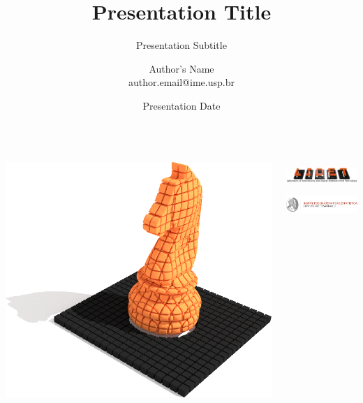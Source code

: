 \expandafter\documentclass\expandafter[table, usenames, svgnames, dvipsnames, \classopts]{beamer}
\title{\textbf{Presentation Title}}
\subtitle{{\small Presentation Subtitle}}
\author[Author's Name]{\scriptsize
    Author's Name\\
    author.email@ime.usp.br
}
\institute[LIDET (IME - USP)]{\\[1.0mm] 
MSc/PhD Student\\
Department of Computer Science}
\date{{\tiny Presentation Date}}
\begin{document}


{%
\begin{frame}

	\begin{columns}[c]
			\hspace*{-1.5em}
			\includegraphics[width=0.35\paperwidth]{side_bar}\\
			\titlepage
			\hspace*{+0.5em}
			\begin{center}
				\includegraphics[height=1.0cm]{lidet-logo}\\
				\includegraphics[height=1.0cm]{ime-logo}\\
			\end{center}
	\end{columns}
\end{frame}
}
\end{document}
